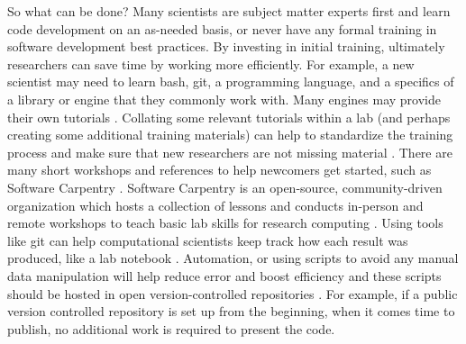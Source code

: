 So what can be done?
Many scientists are subject matter experts first and learn code development on an as-needed basis, or never have any formal training in software development best practices. 
By investing in initial training, ultimately researchers can save time by working more efficiently.
For example, a new scientist may need to learn bash, git, a programming language, and a specifics of a library or engine that they commonly work with.
Many engines may provide their own tutorials \cite{hoomd_tutorials, Lemkul2019, Lemkul2020}.
Collating some relevant tutorials within a lab (and perhaps creating some additional training materials) can help to standardize the training process and make sure that new researchers are not missing material \cite{notebooktutorials}.
There are many short workshops and references to help newcomers get started, such as Software Carpentry \cite{Wilson2014}.
Software Carpentry is an open-source, community-driven organization which hosts a collection of lessons and conducts in-person and remote workshops to teach basic lab skills for research computing \cite{swc-main}.
Using tools like git can help computational scientists keep track how each result was produced, like a lab notebook \cite{Sandve2013}.
Automation, or using scripts to avoid any manual data manipulation will help reduce error and boost efficiency and these scripts should be hosted in open version-controlled repositories \cite{Sandve2013}.
For example, if a public version controlled repository is set up from the beginning, when it comes time to publish, no additional work is required to present the code.

